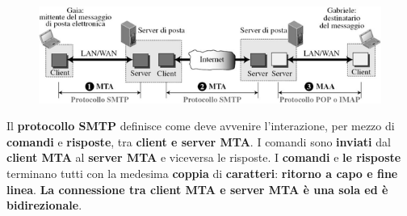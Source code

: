 \documentclass[11pt,a4paper,oneside]{book}
\theoremstyle{definition}
\begin{document}
\begin{figure}[!h]
	\includegraphics[scale=0.7]{Immagini/SMTP.png}
	\centering
\end{figure}
Il \textbf{protocollo SMTP} definisce come deve avvenire l'interazione, per mezzo di \textbf{comandi} e \textbf{risposte}, tra \textbf{client e server MTA}. I comandi sono \textbf{inviati} dal \textbf{client MTA} al \textbf{server MTA} e viceversa le risposte.
I \textbf{comandi} e \textbf{le risposte} terminano tutti con la medesima \textbf{coppia} di \textbf{caratteri}: \textbf{ritorno a capo e fine linea}. \textbf{La connessione tra client MTA e server MTA è una sola ed è bidirezionale}.\newline
\end{document}
